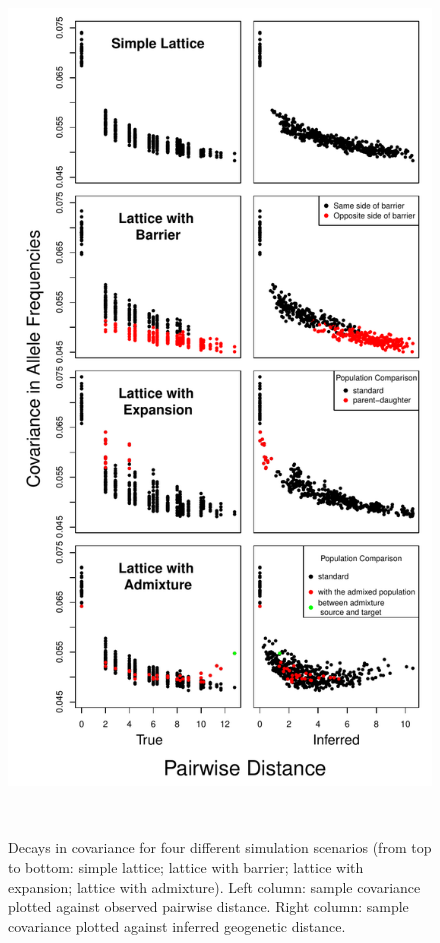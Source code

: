\documentclass[10pt,letterpaper]{article}
\begin{document}
\begin{figure}
	\centering
		{\includegraphics[width=4.8in,height=8.8in]{../figs/sims/sim_covariance_decays.pdf}}
		\caption{Decays in covariance for four different simulation scenarios (from top to bottom: simple lattice; lattice with barrier; lattice with expansion; lattice with admixture).  Left column: sample covariance plotted against observed pairwise distance.  Right column: sample covariance plotted against inferred geogenetic distance.}
	\label{sfig:sim_covariance_decays}
\end{figure}
\end{document}
